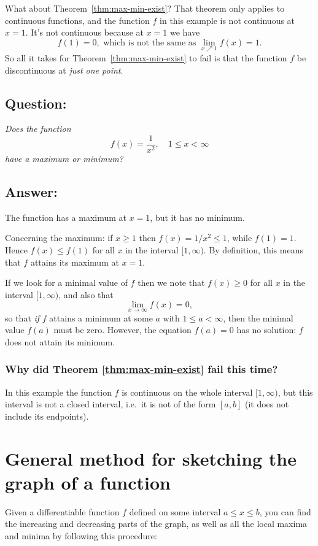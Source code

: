 What about Theorem~\ref{thm:max-min-exist}?  That theorem only applies to
continuous functions, and the function $f$ in this example is not continuous at
$x=1$.  It's not continuous because at $x=1$ we have
\[
f(1) = 0, \text{ which is not the same as } \lim_{x\nearrow1} f(x)=1.
\]
So all it takes for Theorem~\ref{thm:max-min-exist} to fail is that
the function $f$ be discontinuous at \textit{just one point}.

\subsection{Question: }
\itshape Does the function
\[
f(x) = \frac1{x^2}, \quad 1\leq x<\infty
\]
have a maximum or minimum?\upshape

\subsection*{Answer: }
The function has a maximum at $x=1$, but it has no
minimum.

Concerning the maximum: if $x\geq 1$ then $f(x) = 1/{x^2}\leq1$, while
$f(1) = 1$.  Hence $f(x)\leq f(1)$ for all $x$ in the interval $[1,
\infty)$. By definition, this means that $f$ attains its maximum at
$x=1$.


If we look for a minimal value of $f$ then we note that $f(x)\geq0$ for all $x$
in the interval $[1,\infty)$, and also that
\[
\lim_{x\to\infty} f(x) = 0,
\]
so that \emph{if} $f$ attains a minimum at some $a$ with $1\leq a<\infty$, then
the minimal value $f(a)$ must be zero.  However, the equation $f(a) = 0$ has no
solution: $f$ does not attain its minimum.


\subsubsection*{Why did Theorem \ref{thm:max-min-exist} fail this time? }
In this example the function $f$ is continuous on the whole interval
$[1,\infty)$, but this interval is not a closed interval, i.e.\ it is not of the
form $[a,b]$ (it does not include its endpoints).

\section{General method for sketching the graph of a function}
Given a differentiable function $f$ defined on some interval $a\leq x\leq b$,
you can find the increasing and decreasing parts of the graph, as well as all
the local maxima and minima by following this procedure:


